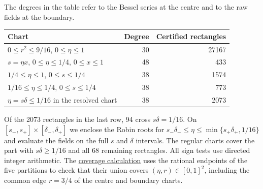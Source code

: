 \documentclass[a4paper,11pt]{amsart}
\newcommand{\repofile}[2]{\href{https://github.com/MColbrook/transmission-shape-optimisation/blob/main/#1}{#2}}
\numberwithin{equation}{section}
\theoremstyle{plain}
\theoremstyle{definition}
\begin{document}
The degrees in the table refer to the Bessel series at the centre and
to the raw fields at the boundary.
\begin{center}
\begin{tabular}{lrr}
\hline
Chart & Degree & Certified rectangles\\
\hline
$0\le r^2\le9/16$, $0\le\eta\le1$ & 30 & 27167\\
$s=\eta x$, $0\le\eta\le1/4$, $0\le x\le1$ & 48 & 433\\
$1/4\le\eta\le1$, $0\le s\le1/4$ & 38 & 1574\\
$1/16\le\eta\le1/4$, $0\le s\le1/4$ & 38 & 773\\
$\eta=s\delta\le1/16$ in the resolved chart & 38 & 2073\\
\hline
\end{tabular}
\end{center}
Of the 2073 rectangles in the last row, 94 cross
\(s\delta=1/16\). On \([s_-,s_+]\times[\delta_-,\delta_+]\) we
enclose the Robin roots for
\(s_-\delta_-\le\eta\le\min\{s_+\delta_+,1/16\}\)
and evaluate the fields on the full \(s\) and \(\delta\) intervals.
The regular charts cover the part with \(s\delta\ge1/16\) and all
68 remaining rectangles. All sign tests use directed integer arithmetic.
The \repofile{certificates/continuation/audit_all_contrast_coverage.py}{coverage calculation}
uses the rational endpoints of the five partitions to check that
their union covers \((\eta,r)\in[0,1]^2\), including the common
edge \(r=3/4\) of the centre and boundary charts.
\end{document}

